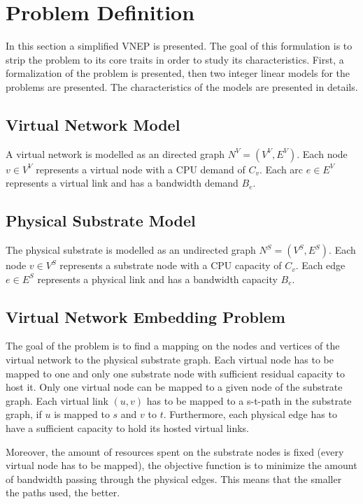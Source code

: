 \section{Problem Definition}
\label{sec:problem}
In this section a simplified VNEP is presented. The goal of this formulation is to strip the problem to its core traits in order to study its characteristics. First, a formalization of the problem is presented, then two integer linear models for the problems are presented. The characteristics of the models are presented in details.

\label{sec:problem}
\subsection{Virtual Network Model}
A virtual network is modelled as an directed graph $N^{V}=(V^{V},E^{V})$. Each node $v \in V^{V}$ represents a virtual node with a CPU demand of $C_{v}$. Each arc $e \in E^{V}$ represents a virtual link and has a bandwidth demand $B_{e}$.

\subsection{Physical Substrate Model}
The physical substrate is modelled as an undirected graph $N^{S}=(V^{S},E^{S})$. Each node $v \in V^{S}$ represents a substrate node with a CPU capacity of $C_{v}$. Each edge $e \in E^{S}$ represents a physical link and has a bandwidth capacity $B_{e}$.

\subsection{Virtual Network Embedding Problem}
The goal of the problem is to find a mapping on the nodes and vertices of the virtual network to the physical substrate graph. Each virtual node has to be mapped to one and only one substrate node with sufficient residual capacity to host it. Only one virtual node can be mapped to a given node of the substrate graph. Each virtual link $(u,v)$ has to be mapped to a s-t-path in the substrate graph, if $u$ is mapped to $s$ and $v$ to $t$. Furthermore, each physical edge has to have a sufficient capacity to hold its hosted virtual links.

Moreover, the amount of resources spent on the substrate nodes is fixed (every virtual node has to be mapped), the objective function is to minimize the amount of bandwidth passing through the physical edges. This means that the smaller the paths used, the better.

